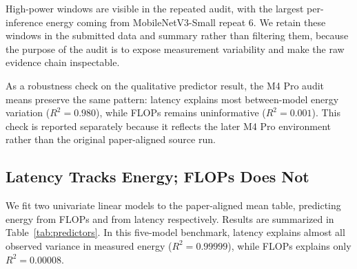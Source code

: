 \documentclass{svproc}
\begin{document}
High-power windows are visible in the repeated audit, with the largest
per-inference energy coming from MobileNetV3-Small repeat 6. We retain these
windows in the submitted data and summary rather than filtering them, because
the purpose of the audit is to expose measurement variability and make the raw
evidence chain inspectable.

\begin{table}[ht]
\centering
\caption{Direct repeated \texttt{powermetrics} audit on the local Apple M4 Pro MacBook Pro.}
\label{tab:energy-repeat}
\small
{}
\end{table}

As a robustness check on the qualitative predictor result, the M4 Pro audit
means preserve the same pattern: latency explains most between-model energy
variation ($R^2 = 0.980$), while FLOPs remains uninformative
($R^2 = 0.001$). This check is reported separately because it reflects the
later M4 Pro environment rather than the original paper-aligned source run.

\subsection{Latency Tracks Energy; FLOPs Does Not}
\label{sec:predictors}
We fit two univariate linear models to the paper-aligned mean table, predicting
energy from FLOPs and from latency respectively. Results are summarized in
Table~\ref{tab:predictors}. In this five-model benchmark, latency explains
almost all observed variance in measured energy ($R^2 = 0.99999$), while FLOPs
explains only $R^2 = 0.00008$.
\end{document}
